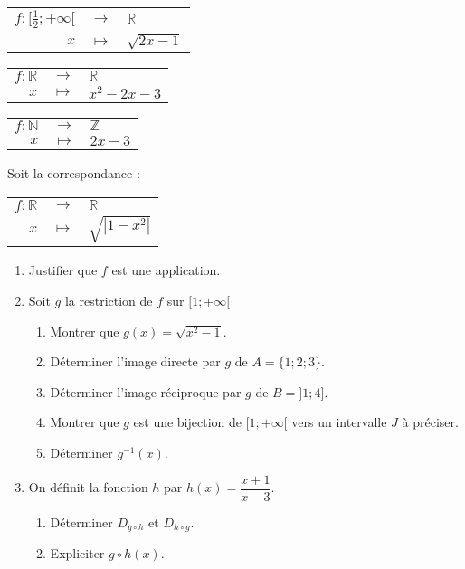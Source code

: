 \documentclass[12pt]{article}
\begin{document}
\bigskip

\renewcommand{\arraystretch}{1.3}
\begin{tabular}{rcl}
    \( f : [\frac{1}{2}; +\infty[ \) & \( \to \) & \( \mathbb{R} \) \\
    \( x \) & \( \mapsto \) & \( \sqrt{2x - 1} \)
\end{tabular}

\bigskip

\renewcommand{\arraystretch}{1.3}
\begin{tabular}{rcl}
    \( f : \mathbb{R} \) & \( \to \) & \( \mathbb{R} \) \\
    \( x \) & \( \mapsto \) & \( x^2 - 2x - 3 \)
\end{tabular}

\bigskip

\renewcommand{\arraystretch}{1.3}
\begin{tabular}{rcl}
    \( f : \mathbb{N} \) & \( \to \) & \( \mathbb{Z} \) \\
    \( x \) & \( \mapsto \) & \( 2x - 3 \)
\end{tabular}

\bigskip


\bigskip

Soit la correspondance :

\bigskip

\renewcommand{\arraystretch}{1.3}
\begin{tabular}{rcl}
    \( f : \mathbb{R} \) & \( \to \) & \( \mathbb{R} \) \\
    \( x \) & \( \mapsto \) & \( \sqrt{|1 - x^2|} \)
\end{tabular}

\bigskip

\begin{enumerate}
    \item Justifier que \( f \) est une application.
    \item Soit \( g \) la restriction de \( f \) sur \([1; +\infty[\)
    \begin{enumerate}
        \item Montrer que \( g(x) = \sqrt{x^2 - 1} \).
        \item Déterminer l’image directe par \( g \) de \( A = \{1;2;3\} \).
        \item Déterminer l’image réciproque par \( g \) de \( B = ]1;4] \).
        \item  Montrer que \( g \) est une bijection de \([1; +\infty[\) vers un intervalle \( J \) à préciser.
        \item  Déterminer \( g^{-1}(x) \).
    \end{enumerate}
    \item On définit la fonction \( h \) par \( h(x) = \dfrac{x+1}{x-3} \).
    \begin{enumerate}
        \item Déterminer \( D_{g \circ h} \) et \( D_{h \circ g} \).
        \item Expliciter \( g \circ h(x) \).
    \end{enumerate}
\end{enumerate}
\end{document}
